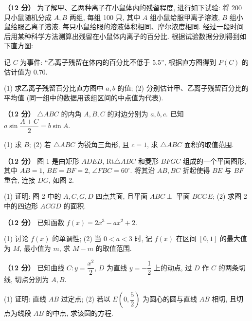 \Needspace{0.4\textheight}
\begin{question}
\textbf{（12 分）} 
为了解甲、乙两种离子在小鼠体内的残留程度, 进行如下试验: 将 200 只小鼠随机分成 $A, B$ 两组, 每组 100 只, 其中 $A$ 组小鼠给服甲离子溶液, $B$ 组小鼠给服乙离子溶液. 每只小鼠给服的溶液体积相同、摩尔浓度相同. 经过一段时间后用某种科学方法测算出残留在小鼠体内离子的百分比. 根据试验数据分别得到如下直方图:
\nopagebreak[4]
\begin{center}\end{center}
\nopagebreak[4]
记 $C$ 为事件: “乙离子残留在体内的百分比不低于 5.5”, 根据直方图得到 $P(C)$ 的估计值为 $0.70$.

(1) 求乙离子残留百分比直方图中 $a, b$ 的值;  
(2) 分别估计甲、乙离子残留百分比的平均值 (同一组中的数据用该组区间的中点值为代表).

\end{question}
\begin{question}
\textbf{（12 分）} 
$\triangle ABC$ 的内角 $A, B, C$ 的对边分别为 $a, b, c$. 已知 $a \sin \dfrac{A+C}{2} = b \sin A$.

(1) 求 $B$;  
(2) 若 $\triangle ABC$ 为锐角三角形, 且 $c = 1$, 求 $\triangle ABC$ 面积的取值范围.

\Needspace{0.4\textheight}
\end{question}
\begin{question}
\textbf{（12 分）} 
图 1 是由矩形 $ADEB$, $\text{Rt}\triangle ABC$ 和菱形 $BFGC$ 组成的一个平面图形, 其中 $AB = 1$, $BE = BF = 2$, $\angle FBC = 60^\circ$. 将其沿 $AB, BC$ 折起使得 $BE$ 与 $BF$ 重合, 连接 $DG$, 如图 2.
\nopagebreak[4]
\begin{center}\end{center}
\nopagebreak[4]
(1) 证明: 图 2 中的 $A, C, G, D$ 四点共面, 且平面 $ABC \perp$ 平面 $BCGE$;  
(2) 求图 2 中的四边形 $ACGD$ 的面积.

\end{question}
\begin{question}
\textbf{（12 分）} 
已知函数 $f(x) = 2x^3 - ax^2 + 2$.

(1) 讨论 $f(x)$ 的单调性;  
(2) 当 $0 < a < 3$ 时, 记 $f(x)$ 在区间 $[0, 1]$ 的最大值为 $M$, 最小值为 $m$, 求 $M - m$ 的取值范围.

\end{question}
\begin{question}
\textbf{（12 分）} 
已知曲线 $C: y = \dfrac{x^2}{2}$, $D$ 为直线 $y = -\dfrac{1}{2}$ 上的动点, 过 $D$ 作 $C$ 的两条切线, 切点分别为 $A, B$.

(1) 证明: 直线 $AB$ 过定点;  
(2) 若以 $E\left(0, \dfrac{5}{2}\right)$ 为圆心的圆与直线 $AB$ 相切, 且切点为线段 $AB$ 的中点, 求该圆的方程.

\par\medskip

\end{question}

